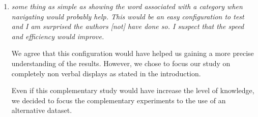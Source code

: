 \documentclass[10pt]{article}
\begin{document}
\begin{enumerate}
\item \emph{some thing 
as simple as showing the word associated with a category when navigating would probably help. This would be an easy configuration to test and I am surprised the authors [not]
have done so. I suspect that the speed and efficiency would improve.
}

We agree that this configuration would have helped us gaining a more precise understanding of the results. However, we chose to focus our study on completely non verbal displays as stated in the introduction.

Even if this complementary study would have increase the level of knowledge, we decided to focus the complementary experiments to the use of an alternative dataset.

\end{enumerate}
\end{document}
